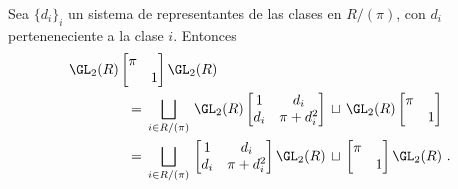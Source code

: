 \begin{propoDescomposicionDeLaCoclaseDobleAIzqYADer}%
	\label{thm:descomposiciondelacoclasedobleaizyader}
	Sea $\{d_{i}\}_{i}$ un sistema de representantes de las clases en
	$R/(\pi)$, con $d_{i}$ perteneneciente a la clase $i$. Entonces
	\begin{equation}
		\label{eq:descomposiciondelacoclasedobleaizqyader}
		\begin{aligned}
			& \GL_{2}(R)\begin{bmatrix} \pi & \\ & 1 \end{bmatrix}
				\GL_{2}(R) \\
			& \qquad\qquad\,=\,
			\bigsqcup_{i\in R/(\pi)}\,\GL_{2}(R)
				\begin{bmatrix} 1 & d_{i} \\
					d_{i} & \pi + d_{i}^{2} \end{bmatrix}
			\,\sqcup\,\GL_{2}(R)
				\begin{bmatrix} \pi & \\ & 1 \end{bmatrix} \\
			& \qquad\qquad\,=\,
			\bigsqcup_{i\in R/(\pi)}\,
				\begin{bmatrix} 1 & d_{i} \\
					d_{i} & \pi + d_{i}^{2} \end{bmatrix}
						\GL_{2}(R) \,\sqcup\,
				\begin{bmatrix} \pi & \\ & 1 \end{bmatrix}
					\GL_{2}(R)
			\text{ .}
		\end{aligned}
	\end{equation}
\end{propoDescomposicionDeLaCoclaseDobleAIzqYADer}

